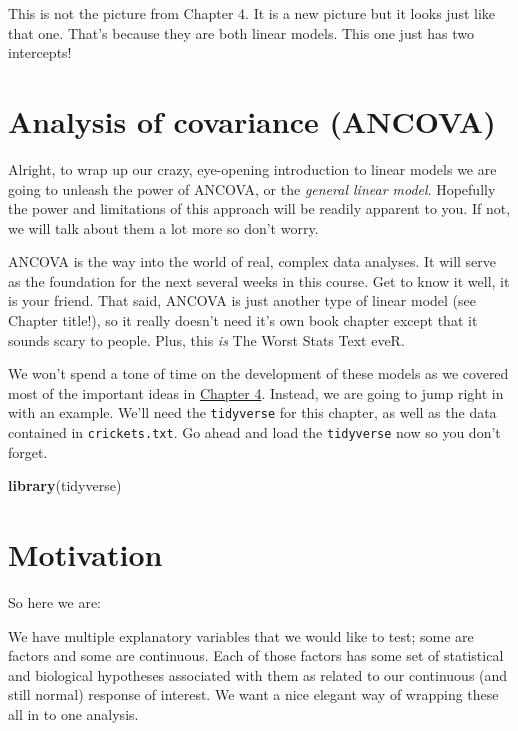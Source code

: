 \documentclass[
]{book}
\newenvironment{Shaded}{\begin{snugshade}}{\end{snugshade}}
\newcommand{\KeywordTok}[1]{\textcolor[rgb]{0.13,0.29,0.53}{\textbf{#1}}}
\newcommand{\NormalTok}[1]{#1}
\begin{document}
This is not the picture from Chapter 4. It is a new picture but it looks just like that one. That's because they are both linear models. This one just has two intercepts!

\hypertarget{analysis-of-covariance-ancova}{%
\section{Analysis of covariance (ANCOVA)}\label{analysis-of-covariance-ancova}}

Alright, to wrap up our crazy, eye-opening introduction to linear models we are going to unleash the power of ANCOVA, or the \emph{general linear model}. Hopefully the power and limitations of this approach will be readily apparent to you. If not, we will talk about them a lot more so don't worry.

ANCOVA is the way into the world of real, complex data analyses. It will serve as the foundation for the next several weeks in this course. Get to know it well, it is your friend. That said, ANCOVA is just another type of linear model (see Chapter title!), so it really doesn't need it's own book chapter except that it sounds scary to people. Plus, this \emph{is} The Worst Stats Text eveR.

We won't spend a tone of time on the development of these models as we covered most of the important ideas in \protect\hyperlink{Chapter4}{Chapter 4}. Instead, we are going to jump right in with an example. We'll need the \texttt{tidyverse} for this chapter, as well as the data contained in \texttt{crickets.txt}. Go ahead and load the \texttt{tidyverse} now so you don't forget.

\begin{Shaded}
\begin{Highlighting}[]
\KeywordTok{library}\NormalTok{(tidyverse)}
\end{Highlighting}
\end{Shaded}

\hypertarget{motivation}{%
\section{Motivation}\label{motivation}}

So here we are:

We have multiple explanatory variables that we would like to test; some are factors and some are continuous. Each of those factors has some set of statistical and biological hypotheses associated with them as related to our continuous (and still normal) response of interest. We want a nice elegant way of wrapping these all in to one analysis.
\end{document}
